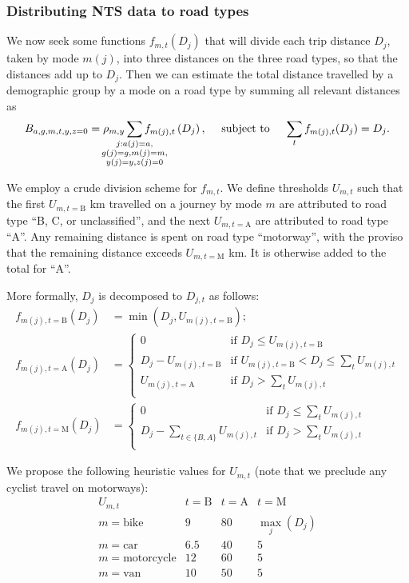 \documentclass{article}
\begin{document}
\subsubsection{Distributing NTS data to road types}\label{distribute}

We now seek some functions $f_{m,t}(D_j)$ that will divide each trip distance $D_j$, taken by mode $m(j)$, into three distances on the three road types, so that the distances add up to $D_j$. Then we can estimate the total distance travelled by a demographic group by a mode on a road type by summing all relevant distances as $$B_{a,g,m,t,y,z=0}= \rho_{m,y}\smashoperator{\sum_{\substack{j:a(j)=a,\\g(j)=g,m(j)=m,\\y(j)=y,z(j)=0}}}f_{m(j),t}\left(D_{j}\right),
\quad  \text{ subject to } \quad\sum_t f_{m(j),t}(D_j)=D_j.$$

We employ a crude division scheme for $f_{m,t}$. We define thresholds $U_{m,t}$ such that the first $U_{m,t=\text{B}}$ km travelled on a journey by mode $m$ are attributed to road type ``B, C, or unclassified'', and the next $U_{m,t=\text{A}}$ are attributed to road type ``A''. Any remaining distance is spent on road type ``motorway'', with the proviso that the remaining distance exceeds $U_{m,t=\text{M}}$ km. It is otherwise added to the total for ``A''. 

More formally, $D_j$ is decomposed to $D_{j,t}$ as follows:
\begin{align}
f_{m(j),t=\text{B}}(D_{j}) &= \min\left(D_j,U_{m(j),t=\text{B}}\right); \\
f_{m(j),t=\text{A}}(D_{j}) &=\left\{\begin{array}{lr} 
0 & \text{if } D_j\leq U_{m(j),t=\text{B}} \\
D_j-U_{m(j),t=\text{B}} & \text{if } U_{m(j),t=\text{B}}< D_{j}\leq\sum_tU_{m(j),t}\\
U_{m(j),t=\text{A}} & \text{if } D_{j}>\sum_tU_{m(j),t} \\
\end{array}\right.\\
f_{m(j),t=\text{M}}(D_{j}) &=\left\{\begin{array}{lr} 
0 & \text{if } D_j\leq \sum_tU_{m(j),t} \\
D_j-\sum_{t\in\{B,A\}}U_{m(j),t} & \text{if } D_{j}>\sum_tU_{m(j),t} \\
\end{array}\right.
\end{align}

We propose the following heuristic values for $U_{m,t}$ (note that we preclude any cyclist travel on motorways):
\begin{equation}\begin{array}{r|ccc}
U_{m,t} & t=\text{B}&t=\text{A} &t=\text{M} \\
\hline
m=\text{bike} & 9 & 80 & \max_j(D_j) \\
m=\text{car} & 6.5 & 40 & 5 \\
m=\text{motorcycle} & 12 & 60 & 5 \\
m=\text{van} & 10 & 50 & 5 \\
\end{array}\end{equation}
\end{document}

